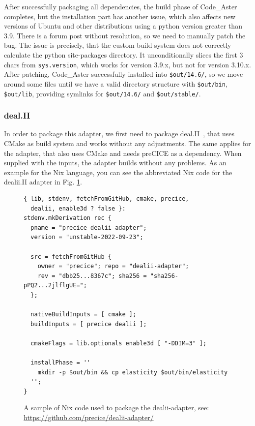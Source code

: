 \documentclass{eceasst}
\newcommand{\todo}[1]{\pdfcomment[color={0.045 0.278 0.643},icon=Note]{#1}}
\begin{document}
After successfully packaging all dependencies, the build phase of Code\_Aster completes, but the installation part has another issue, which also affects new versions of Ubuntu and other distributions using a python version greater than 3.9.
There is a forum post without resolution, so we need to manually patch the bug. \todo{link post}
The issue is precisely, that the custom build system does not correctly calculate the python site-packages directory. It unconditionally slices the first 3 chars from \texttt{sys.version}, which works for version 3.9.x, but not for version 3.10.x.
After patching, Code\_Aster successfully installed into \texttt{\$out/14.6/}, so we move around some files until we have a valid directory structure with \texttt{\$out/bin}, \texttt{\$out/lib}, providing symlinks for \texttt{\$out/14.6/} and \texttt{\$out/stable/}.

\subsubsection{deal.II}

In order to package this adapter, we first need to package deal.II~\cite{dealII95}, that uses CMake as build system and works without any adjustments.
The same applies for the adapter, that also uses CMake and needs preCICE as a dependency.
When supplied with the inputs, the adapter builds without any problems.
As an example for the Nix language, you can see the abbreviated Nix code for the dealii.II adapter in Fig. \ref{lst:dealii-adapter-nix}.\\

\begin{figure}
    \normalsize
    \begin{verbatim}
{ lib, stdenv, fetchFromGitHub, cmake, precice,
  dealii, enable3d ? false }:
stdenv.mkDerivation rec {
  pname = "precice-dealii-adapter";
  version = "unstable-2022-09-23";

  src = fetchFromGitHub {
    owner = "precice"; repo = "dealii-adapter";
    rev = "dbb25...8367c"; sha256 = "sha256-pPQ2...2jlflgUE=";
  };

  nativeBuildInputs = [ cmake ];
  buildInputs = [ precice dealii ];

  cmakeFlags = lib.optionals enable3d [ "-DDIM=3" ];

  installPhase = ''
    mkdir -p $out/bin && cp elasticity $out/bin/elasticity
  '';
}
    \end{verbatim}
    \caption{A sample of Nix code used to package the dealii-adapter, see: \url{https://github.com/precice/dealii-adapter/}}
    \label{lst:dealii-adapter-nix}
\end{figure}
\end{document}
